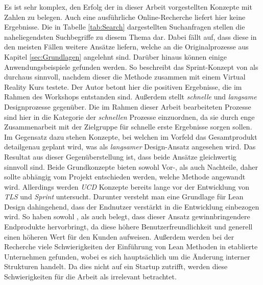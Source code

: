 Es ist sehr komplex, den Erfolg der in dieser Arbeit vorgestellten Konzepte mit Zahlen zu belegen. Auch eine ausführliche Online-Recherche liefert hier keine Ergebnisse. Die in Tabelle \ref{tab:Search} dargestellten Suchanfragen stellen die naheliegendsten Suchbegriffe zu diesem Thema dar. Dabei fällt auf, dass diese in den meisten Fällen weitere Ansätze liefern, welche an die Originalprozesse aus Kapitel \ref{sec:Grundlagen} angelehnt sind. Darüber hinaus können einige Anwendungsbeispiele gefunden werden. So beschreibt  das Sprint-Konzept von \citeauthor{Sprint} als durchaus sinnvoll, nachdem dieser die Methode zusammen mit einem Virtual Reality Kurs testete. Der Autor betont hier die positiven Ergebnisse, die im Rahmen des Workshops entstanden sind. Außerdem stellt  \textit{schnelle} und \textit{langsame} Designprozesse gegenüber. Die im Rahmen dieser Arbeit bearbeiteten Prozesse sind hier in die Kategorie der \textit{schnellen} Prozesse einzuordnen, da sie durch enge Zusammenarbeit mit der Zielgruppe für schnelle erste Ergebnisse sorgen sollen. Im Gegensatz dazu stehen Konzepte, bei welchen im Vorfeld das Gesamtprodukt detailgenau geplant wird, was als \textit{langsamer} Design-Ansatz angesehen wird. Das Resultat aus dieser Gegenüberstellung ist, dass beide Ansätze gleichwertig sinnvoll sind. Beide Grundkonzepte bieten sowohl Vor-, als auch Nachteile, daher sollte abhängig vom Projekt entschieden werden, welche Methode angewandt wird. Allerdings werden \textit{\ac{UCD}} Konzepte bereits lange vor der Entwicklung von \textit{\ac{TLS}} und \textit{Sprint} untersucht. Darunter versteht man eine Grundlage für Lean Design dahingehend, dass der Endnutzer verstärkt in die Entwicklung einbezogen wird. So haben \citeauthor{vredenburg2002survey} sowohl \citeyear{vredenburg2002survey}, als auch \citeyear{mao2005state} belegt, dass dieser Ansatz gewinnbringendere Endprodukte hervorbringt, da diese höhere Benutzerfreundlichkeit und generell einen höheren Wert für den Kunden aufweisen. Außerdem werden bei der Recherche viele Schwierigkeiten der Einführung von Lean Methoden in etablierte Unternehmen gefunden, wobei es sich hauptsächlich um die Änderung interner Strukturen handelt. Da dies nicht auf ein Startup zutrifft, werden diese Schwierigkeiten für die Arbeit als irrelevant betrachtet.


